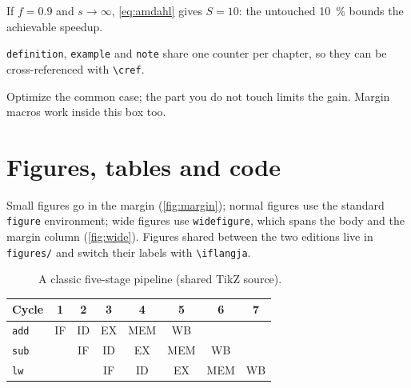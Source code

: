 \documentclass[../main.tex]{subfiles}
\begin{document}
\begin{example}
  If $f = 0.9$ and $s \to \infty$, \cref{eq:amdahl} gives $S = 10$: the
  untouched \SI{10}{\percent} bounds the achievable speedup.
\end{example}

\begin{note}
  \verb|definition|, \verb|example| and \verb|note| share one counter per
  chapter, so they can be cross-referenced with \verb|\cref|.
\end{note}

\begin{keypoint}
  Optimize the common case; the part you do not touch limits the gain.
  Margin macros work inside this box too.
\end{keypoint}

\section{Figures, tables and code}

\begin{marginfigure}
  \caption{A figure in the margin (\texttt{marginfigure}).}
  \label{fig:margin}
\end{marginfigure}

Small figures go in the margin (\cref{fig:margin}); normal figures use the
standard \verb|figure| environment; wide figures use \verb|widefigure|,
which spans the body and the margin column (\cref{fig:wide}).  Figures shared
between the two editions live in \texttt{figures/} and switch their labels
with \verb|\iflangja|.

\begin{figure}[htbp]
  \centering
  
  \caption{A classic five-stage pipeline (shared TikZ source).}
  \label{fig:pipeline}
\end{figure}

\begin{widefigure}[htbp]
  \begin{tabular}{@{}lccccccc@{}}
    \toprule
    Cycle & 1 & 2 & 3 & 4 & 5 & 6 & 7 \\
    \midrule
    \texttt{add}  & IF & ID & EX & MEM & WB &    &    \\
    \texttt{sub}  &    & IF & ID & EX  & MEM & WB &   \\
    \texttt{lw}   &    &    & IF & ID  & EX  & MEM & WB \\
    \bottomrule
  \end{tabular}
  \caption{A wide float spanning body and margin (\texttt{widefigure}).}
  \label{fig:wide}
\end{widefigure}
\end{document}
